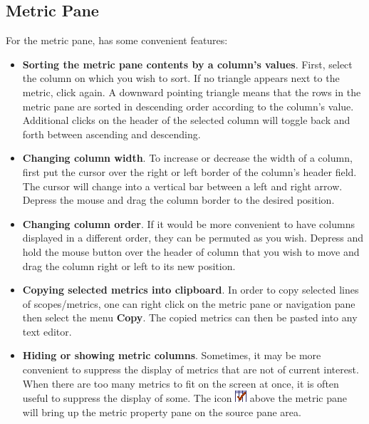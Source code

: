 \subsection{Metric Pane}
\label{sec:hpcviewer:metric-pane}

For the metric pane, \hpcviewer{} has some convenient features:
\begin{itemize}

\item \textbf{Sorting the metric pane contents by a column's values}.
  First, select the column on which you wish to sort.
  If no triangle appears next to the metric, click again.
  A downward pointing triangle means that the rows in the metric pane are sorted in descending order according to the column's value.
  Additional clicks on the header of the selected column will toggle back and forth between ascending and descending.

\item \textbf{Changing column width}.
  To increase or decrease the width of a column, first put the cursor over the right or left border of the column's header field.
  The cursor will change into a vertical bar between a left and right arrow.
  Depress the mouse and drag the column border to the desired position.

\item \textbf{Changing column order}.
  If it would be more convenient to have columns displayed in a different order, they can be permuted as you wish.
  Depress and hold the mouse button over the header of column that you wish to move and drag the column right or left to its new position.

\item \textbf{Copying selected metrics into clipboard}.
  In order to copy selected lines of scopes/metrics, one can right click on the metric pane or navigation pane then select the menu \textbf{Copy}.
  The copied metrics can then be pasted into any text editor.

\item \textbf{Hiding or showing metric columns}.
  Sometimes, it may be more convenient to suppress the display of metrics that are not of current interest.
  When there are too many metrics to fit on the screen at once, it is often useful to suppress the display of some.
  The icon \includegraphics[scale=.7]{fig/hpcviewer-button-checkcolumns.png} above the metric pane will bring up the metric property pane on the source pane area.


\end{itemize}
